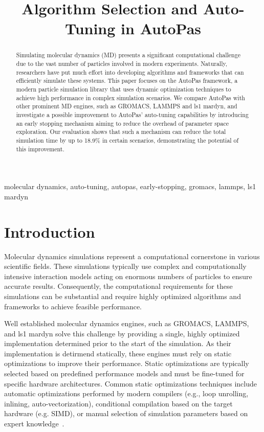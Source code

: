 \documentclass[conference]{IEEEtran}
\begin{document}
\title{Algorithm Selection and Auto-Tuning in AutoPas}

\author{
}

\maketitle

\begin{abstract}
    Simulating molecular dynamics (MD) presents a significant computational challenge due to the vast number of particles involved in modern experiments. Naturally, researchers have put much effort into developing algorithms and frameworks that can efficiently simulate these systems. This paper focuses on the AutoPas framework, a modern particle simulation library that uses dynamic optimization techniques to achieve high performance in complex simulation scenarios. We compare AutoPas with other prominent MD engines, such as GROMACS, LAMMPS and ls1 mardyn, and investigate a possible improvement to AutoPas' auto-tuning capabilities by introducing an early stopping mechanism aiming to reduce the overhead of parameter space exploration. Our evaluation shows that such a mechanism can reduce the total simulation time by up to 18.9\% in certain scenarios, demonstrating the potential of this improvement.
\end{abstract}

\begin{IEEEkeywords}
    molecular dynamics, auto-tuning, autopas, early-stopping, gromacs, lammps, ls1 mardyn
\end{IEEEkeywords}

\section{Introduction}

Molecular dynamics simulations represent a computational cornerstone in various scientific fields. These simulations typically use complex and computationally intensive interaction models acting on enormous numbers of particles to ensure accurate results. Consequently, the computational requirements for these simulations can be substantial and require highly optimized algorithms and frameworks to achieve feasible performance.

Well established molecular dynamics engines, such as GROMACS, LAMMPS, and ls1 mardyn solve this challenge by providing a single, highly optimized implementation determined prior to the start of the simulation. As their implementation is detirmend statically, these engines must rely on static optimizations to improve their performance. Static optimizations are typically selected based on predefined performance models and must be fine-tuned for specific hardware architectures. Common static optimizations techniques include automatic optimizations performed by modern compilers (e.g., loop unrolling, inlining, auto-vectorization), conditional compilation based on the target hardware (e.g. SIMD), or manual selection of simulation parameters based on expert knowledge~\cite{Gratl2019AutoPas}.
\end{document}
